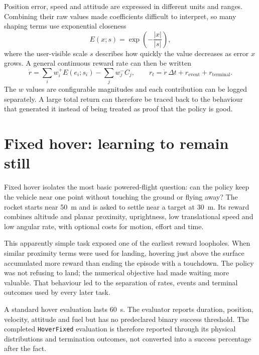 Position error, speed and attitude are expressed in different units and ranges. Combining their
raw values made coefficients difficult to interpret, so many shaping terms use exponential
closeness
\begin{equation}
  E(x;s)=\exp\!\left(-\frac{\lvert x\rvert}{\lvert s\rvert}\right),
  \label{eq:exp01}
\end{equation}
where the user-visible scale $s$ describes how quickly the value decreases as error $x$ grows.
A general continuous reward rate can then be written
\begin{equation}
  \dot r = \sum_i w_i^+ E(e_i;s_i)-\sum_j w_j^- C_j,
  \qquad r_t=\dot r\,\Delta t+r_{\mathrm{event}}+r_{\mathrm{terminal}}.
  \label{eq:reward-general}
\end{equation}
The $w$ values are configurable magnitudes and each contribution can be logged separately. A
large total return can therefore be traced back to the behaviour that generated it instead of
being treated as proof that the policy is good.

\section{Fixed hover: learning to remain still}

Fixed hover isolates the most basic powered-flight question: can the policy keep the vehicle
near one point without touching the ground or flying away? The rocket starts near
\SI{50}{m} and is asked to settle near a target at \SI{30}{m}. Its reward combines altitude and
planar proximity, uprightness, low translational speed and low angular rate, with optional costs
for motion, effort and time.

This apparently simple task exposed one of the earliest reward loopholes. When similar proximity
terms were used for landing, hovering just above the surface accumulated more reward than ending
the episode with a touchdown. The policy was not refusing to land; the numerical objective had
made waiting more valuable. That behaviour led to the separation of rates, events and terminal
outcomes used by every later task.

A standard hover evaluation lasts \SI{60}{s}. The evaluator reports duration, position,
velocity, attitude and fuel but has no predeclared binary success threshold. The completed
\texttt{HoverFixed} evaluation is therefore reported through its physical distributions and
termination outcomes, not converted into a success percentage after the fact.


